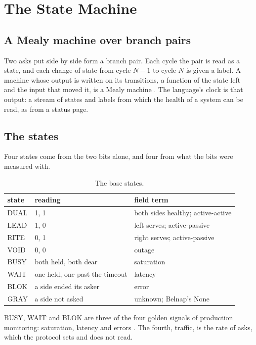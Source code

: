 \chapter{The State Machine}
\label{ch:states}

\section{A Mealy machine over branch pairs}

Two asks put side by side form a branch pair. Each cycle the pair is read as a state, and each
change of state from cycle \(N-1\) to cycle \(N\) is given a label. A machine whose output is
written on its transitions, a function of the state left and the input that moved it, is a Mealy
machine \cite{src:Mealy}. The language's clock is that output: a stream of states and labels from
which the health of a system can be read, as from a status page.

\section{The states}

Four states come from the two bits alone, and four from what the bits were measured with.

\begin{table}[h]
\centering
\small
\begin{tabular}{@{}l l p{6.4cm}@{}}
\toprule
state & reading & field term \\
\midrule
DUAL & 1, 1 & both sides healthy; active-active \\
LEAD & 1, 0 & left serves; active-passive \\
RITE & 0, 1 & right serves; active-passive \\
VOID & 0, 0 & outage \\
BUSY & both held, both dear & saturation \\
WAIT & one held, one past the timeout & latency \\
BLOK & a side ended its asker & error \\
GRAY & a side not asked & unknown; Belnap's None \\
\bottomrule
\end{tabular}
\caption{The base states.}
\label{tab:states}
\end{table}

BUSY, WAIT and BLOK are three of the four golden signals of production monitoring: saturation,
latency and errors \cite{src:SRE}. The fourth, traffic, is the rate of asks, which the protocol
sets and does not read.

